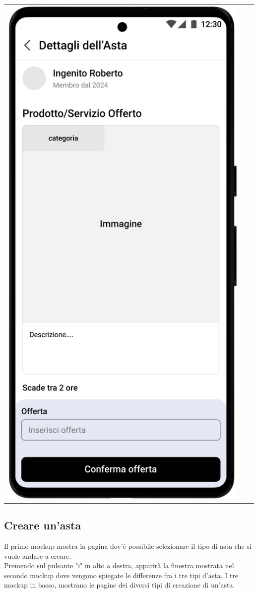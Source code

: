 \begin{center}
\begin{tabular}{ccc}
		\includegraphics[width=.3\textwidth]{images/mockup/Dettaglio Asta Silenziosa.png}    \\
	\end{tabular}
\end{center}

\newpage
\subsection{Creare un'asta}
Il primo mockup mostra la pagina dov'è possibile selezionare il tipo di asta che si vuole andare a creare.\\
Premendo sul pulsante "i" in alto a destra, apparirà la finestra mostrata nel secondo mockup dove vengono spiegate le differenze fra i tre tipi d'asta.\meskip
I tre mockup in basso, mostrano le pagine dei diversi tipi di creazione di un'asta.


